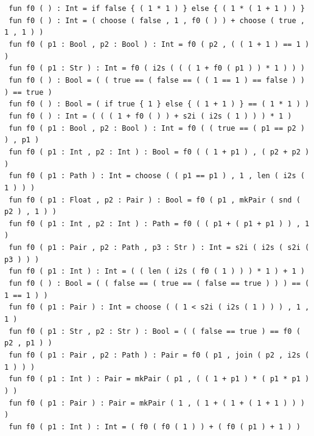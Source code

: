 \documentclass[sigplan,nonacm]{acmart}\settopmatter{printfolios=false,printccs=false,printacmref=false}
\begin{document}
\begin{tiny}
  \texttt{ fun f0 ( ) : Int = if false \{ ( 1 * 1 ) \} else \{ ( 1 * ( 1 + 1 ) ) \}}\\
  \texttt{ fun f0 ( ) : Int = ( choose ( false , 1 , f0 ( ) ) + choose ( true , 1 , 1 ) )}\\
  \texttt{ fun f0 ( p1 : Bool , p2 : Bool ) : Int = f0 ( p2 , ( ( 1 + 1 ) == 1 ) )}\\
  \texttt{ fun f0 ( p1 : Str ) : Int = f0 ( i2s ( ( ( 1 + f0 ( p1 ) ) * 1 ) ) )}\\
  \texttt{ fun f0 ( ) : Bool = ( ( true == ( false == ( ( 1 == 1 ) == false ) ) ) == true )}\\
  \texttt{ fun f0 ( ) : Bool = ( if true \{ 1 \} else \{ ( 1 + 1 ) \} == ( 1 * 1 ) )}\\
  \texttt{ fun f0 ( ) : Int = ( ( ( 1 + f0 ( ) ) + s2i ( i2s ( 1 ) ) ) * 1 )}\\
  \texttt{ fun f0 ( p1 : Bool , p2 : Bool ) : Int = f0 ( ( true == ( p1 == p2 ) ) , p1 )}\\
  \texttt{ fun f0 ( p1 : Int , p2 : Int ) : Bool = f0 ( ( 1 + p1 ) , ( p2 + p2 ) )}\\
  \texttt{ fun f0 ( p1 : Path ) : Int = choose ( ( p1 == p1 ) , 1 , len ( i2s ( 1 ) ) )}\\
  \texttt{ fun f0 ( p1 : Float , p2 : Pair ) : Bool = f0 ( p1 , mkPair ( snd ( p2 ) , 1 ) )}\\
  \texttt{ fun f0 ( p1 : Int , p2 : Int ) : Path = f0 ( ( p1 + ( p1 + p1 ) ) , 1 )}\\
  \texttt{ fun f0 ( p1 : Pair , p2 : Path , p3 : Str ) : Int = s2i ( i2s ( s2i ( p3 ) ) )}\\
  \texttt{ fun f0 ( p1 : Int ) : Int = ( ( len ( i2s ( f0 ( 1 ) ) ) * 1 ) + 1 )}\\
  \texttt{ fun f0 ( ) : Bool = ( ( false == ( true == ( false == true ) ) ) == ( 1 == 1 ) )}\\
  \texttt{ fun f0 ( p1 : Pair ) : Int = choose ( ( 1 < s2i ( i2s ( 1 ) ) ) , 1 , 1 )}\\
  \texttt{ fun f0 ( p1 : Str , p2 : Str ) : Bool = ( ( false == true ) == f0 ( p2 , p1 ) )}\\
  \texttt{ fun f0 ( p1 : Pair , p2 : Path ) : Pair = f0 ( p1 , join ( p2 , i2s ( 1 ) ) )}\\
  \texttt{ fun f0 ( p1 : Int ) : Pair = mkPair ( p1 , ( ( 1 + p1 ) * ( p1 * p1 ) ) )}\\
  \texttt{ fun f0 ( p1 : Pair ) : Pair = mkPair ( 1 , ( 1 + ( 1 + ( 1 + 1 ) ) ) )}\\
  \texttt{ fun f0 ( p1 : Int ) : Int = ( f0 ( f0 ( 1 ) ) + ( f0 ( p1 ) + 1 ) )}\\

\end{tiny}
\end{document}
